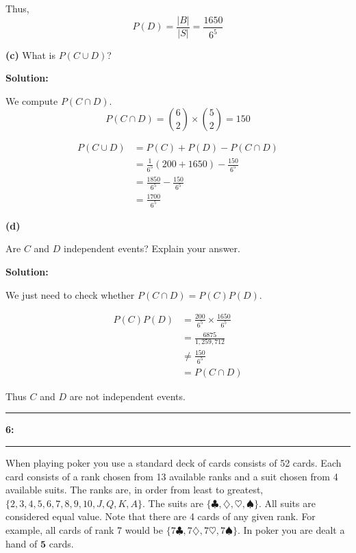 \documentclass[11pt]{article}
\newcommand\question[2]{\vspace{.25in}\hrule\textbf{#1: #2}\vspace{.5em}\hrule\vspace{.10in}}
\renewcommand\part[1]{\vspace{.10in}\textbf{(#1)}}
\newcommand{\solution}{\vspace{.10in}\textbf{Solution: }}
\begin{document}
Thus, 
\begin{equation*}
  P(D) = \frac{|B|}{|S|} = \frac{1650}{6^5}
\end{equation*}

\part{c}  What is $P(C \cup D)$?

\solution

We compute $P(C\cap D)$.
\begin{equation*}
  P(C\cap D) = \binom{6}{2} \times \binom{5}{2} = 150
\end{equation*}


\begin{align*}
  P(C\cup D) &= P(C) + P(D) - P(C\cap D) \\
  &= \frac{1}{6^5}(200 + 1650) - \frac{150}{6^5} \\ 
  &= \frac{1850}{6^5} - \frac{150}{6^5} \\
  &= \frac{1700}{6^5}
\end{align*}

\part{d}

Are $C$ and $D$ independent events? Explain your answer.

\solution

We just need to check whether $P(C\cap D) = P(C)P(D)$.

\begin{align*}
  P(C)P(D) &= \frac{200}{6^5}\times \frac{1650}{6^5} \\
          &= \frac{6875}{1,259,712} \\
          & \neq \frac{150}{6^5} \\
          &= P(C\cap D)
\end{align*}

Thus $C$ and $D$ are not independent events.

\question{6}{}
When playing poker you use a standard deck of cards consists of 52 cards. 
Each card consists of a rank chosen from 13 available ranks and a suit chosen from 4 available suits. The ranks are, in order from least to greatest, $\{2, 3, 4, 5, 6, 7, 8, 9, 10, J, Q, K, A\}$.
The suits are $\{\clubsuit, \diamondsuit, \heartsuit, \spadesuit\}$. All suits are considered equal value. Note that there are 4 cards of any given rank. For example, all cards of rank 7 would be
$\{7\clubsuit, 7\diamondsuit, 7\heartsuit, 7\spadesuit\}$. In poker you are dealt a hand of $\mathbf{5}$ cards.
\end{document}
